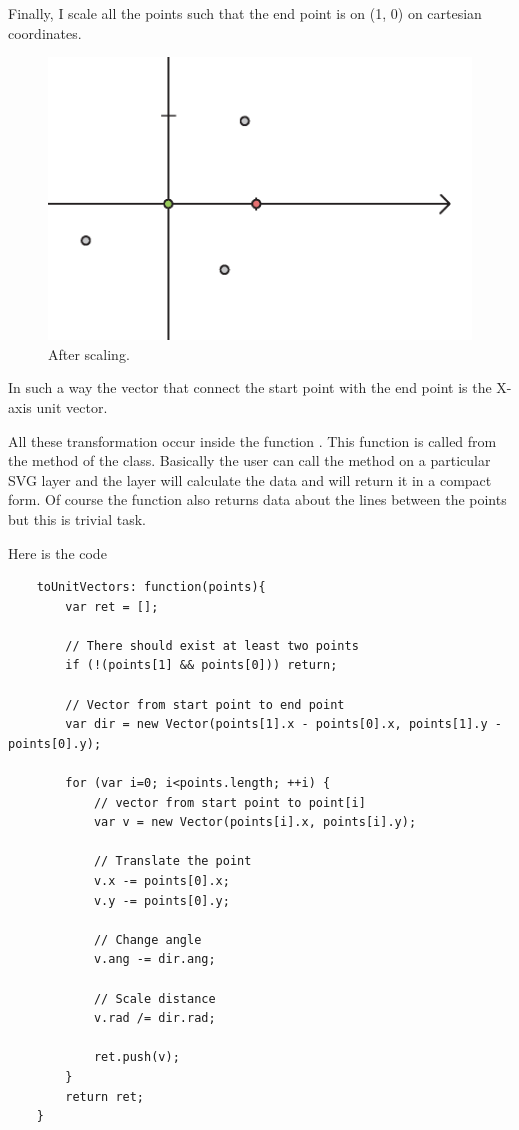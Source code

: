             \FloatBarrier

            Finally, I scale all the points such that the end point is on (1, 0) on cartesian coordinates.

            \begin{figure}[ht]
                \centering
                \caption{After scaling.}
                \includegraphics[scale=0.6]{img/explain05.png}
            \end{figure}

            \FloatBarrier

            In such a way the vector that connect the start point with the end point is the X-axis unit vector.

            All these transformation occur inside the function .
            This function is called from the method  of the  class.
            Basically the user can call the method on a particular SVG layer and the layer will calculate the data and will return it in a compact form.
            Of course the function  also returns data about the lines between the points but this is trivial task.

            Here is the code
            \begin{lstlisting}
    toUnitVectors: function(points){
        var ret = [];

        // There should exist at least two points
        if (!(points[1] && points[0])) return;

        // Vector from start point to end point
        var dir = new Vector(points[1].x - points[0].x, points[1].y - points[0].y);
        
        for (var i=0; i<points.length; ++i) {
            // vector from start point to point[i]
            var v = new Vector(points[i].x, points[i].y);

            // Translate the point
            v.x -= points[0].x;
            v.y -= points[0].y;

            // Change angle
            v.ang -= dir.ang;

            // Scale distance
            v.rad /= dir.rad;

            ret.push(v);
        }
        return ret;   
    }
            \end{lstlisting}


